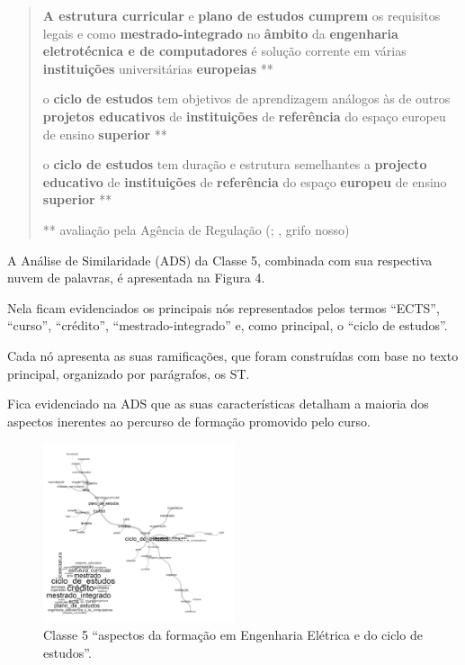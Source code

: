 \documentclass{textolivre}
\begin{document}
\begin{quote}
\textbf{A estrutura curricular} e \textbf{plano de estudos cumprem} os requisitos legais e como \textbf{mestrado-integrado} no \textbf{âmbito} da \textbf{engenharia eletrotécnica e de computadores} é solução corrente em várias \textbf{instituições} universitárias \textbf{europeias} **

o \textbf{ciclo de estudos} tem objetivos de aprendizagem análogos às de outros \textbf{projetos educativos} de \textbf{instituições} de \textbf{referência} do espaço europeu de ensino \textbf{superior} **   

o \textbf{ciclo de estudos} tem duração e estrutura semelhantes a \textbf{projecto educativo} de \textbf{instituições} de \textbf{referência} do espaço \textbf{europeu} de ensino \textbf{superior} **      

** avaliação pela Agência de Regulação (\cite{A3ES2015a}; \cite{A3ES2015b}, grifo nosso)
\end{quote}

A Análise de Similaridade (ADS) da Classe 5, combinada com sua respectiva nuvem de palavras, é apresentada na Figura 4. 

Nela ficam evidenciados os principais nós representados pelos termos “ECTS”, “curso”, “crédito”, “mestrado-integrado” e, como principal, o “ciclo de estudos”.

Cada nó apresenta as suas ramificações, que foram construídas com base no texto principal, organizado por parágrafos, os ST. 

Fica evidenciado na ADS que as suas características detalham a maioria dos aspectos inerentes ao percurso de formação promovido pelo curso.

\begin{figure}[htbp]
 \centering
 \includegraphics[width=0.5\textwidth]{Fig04.png}
 \caption{Classe 5 “aspectos da formação em Engenharia Elétrica e do ciclo de estudos”.}
 \label{Fig04}
\end{figure}
\end{document}
